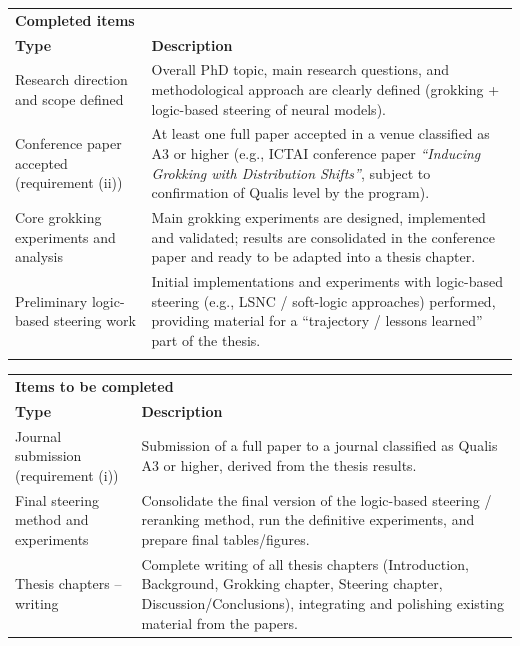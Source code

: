 ﻿\documentclass[../../ppgc-prop-tese.tex]{subfiles}
\begin{document}
\begin{table}[ht]
\centering
\small
\begin{tabular}{p{}p{}}
\hline
\multicolumn{2}{l}{\textbf{Completed items}} \\
\textbf{Type} & \textbf{Description} \\

\hline
Research direction and scope defined &
Overall PhD topic, main research questions, and methodological approach are clearly defined (grokking + logic-based steering of neural models). \\

Conference paper accepted (requirement (ii)) &
At least one full paper accepted in a venue classified as A3 or higher (e.g., ICTAI conference paper \emph{``Inducing Grokking with Distribution Shifts''}, subject to confirmation of Qualis level by the program). \\

Core grokking experiments and analysis &
Main grokking experiments are designed, implemented and validated; results are consolidated in the conference paper and ready to be adapted into a thesis chapter. \\

Preliminary logic-based steering work &
Initial implementations and experiments with logic-based steering (e.g., LSNC / soft-logic approaches) performed, providing material for a ``trajectory / lessons learned'' part of the thesis. \\
\hline
\vspace{1cm}
\end{tabular}

\begin{tabular}{p{}p{}}
\multicolumn{2}{l}{\textbf{Items to be completed}} \\
\textbf{Type} & \textbf{Description} \\
\hline
Journal submission (requirement (i)) &
Submission of a  full paper to a journal classified as Qualis A3 or higher, derived from the thesis results. \\

Final steering method and experiments &
Consolidate the final version of the logic-based steering / reranking method, run the definitive experiments, and prepare final tables/figures. \\

Thesis chapters – writing &
Complete writing of all thesis chapters (Introduction, Background, Grokking chapter, Steering chapter, Discussion/Conclusions), integrating and polishing existing material from the papers. \\


\end{tabular}
\end{table}
\end{document}
